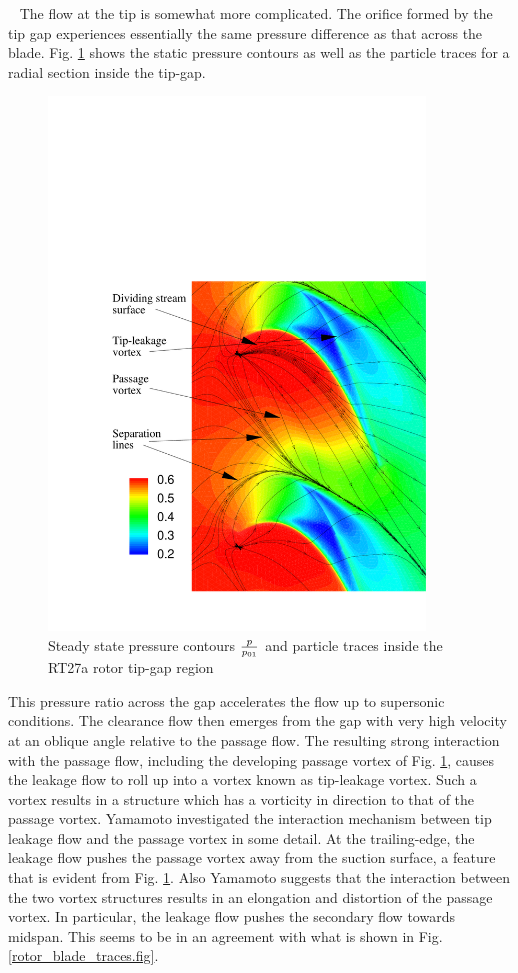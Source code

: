  ~\newline
 The flow at the tip is somewhat more complicated. The orifice formed by the
 tip gap experiences essentially the same pressure difference as that
 across the blade.
 Fig. \ref{rotor_tip_traces.fig} shows the static pressure contours as well as
 the particle traces for a radial section inside the tip-gap.
%
\begin{figure}
 \centerline{\includegraphics[width=100mm]{CHAP_RT27/FIGURE/rotor_tip_traces.pdf}}
 \caption{Steady state pressure contours $\frac{p}{p_{\mbox{\tiny $01$}}}$
          and particle traces inside the RT27a rotor tip-gap region}
 \label{rotor_tip_traces.fig}
\end{figure}
%
 This pressure ratio across the gap accelerates the flow up to supersonic
 conditions. The clearance flow then emerges from the gap with very high velocity
 at an oblique angle relative to the passage flow. The resulting strong interaction
 with the passage flow, including the developing passage vortex of
 Fig. \ref{rotor_tip_traces.fig}, causes the leakage flow to roll up into a vortex
 known as tip-leakage vortex. Such a vortex results in a structure which has a
 vorticity in direction to that of the passage vortex.
 Yamamoto \citeyear{Yamamoto:1} investigated the interaction mechanism
 between tip leakage flow and the passage vortex in some detail.
 At the trailing-edge, the leakage flow pushes the passage vortex away from
 the suction surface, a feature that is evident from Fig. \ref{rotor_tip_traces.fig}.
 Also Yamamoto \citeyear{Yamamoto:1} suggests that the interaction between the
 two vortex structures results in an elongation and distortion of the passage vortex.
 In particular, the leakage flow pushes the secondary flow towards midspan.
 This seems to be in an agreement with what is shown in
 Fig. \ref{rotor_blade_traces.fig}.

